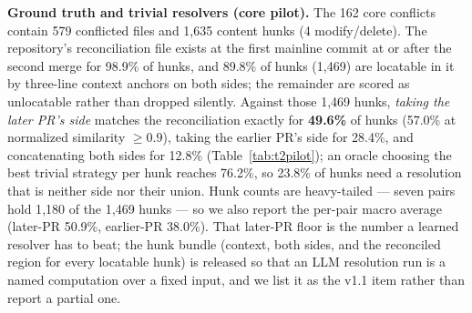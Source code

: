 \documentclass{article}
\begin{document}
\textbf{Ground truth and trivial resolvers (core pilot).} The 162 core conflicts contain 579 conflicted files and 1{,}635 content hunks (4 modify/delete). The repository's reconciliation file exists at the first mainline commit at or after the second merge for 98.9\% of hunks, and 89.8\% of hunks (1{,}469) are locatable in it by three-line context anchors on both sides; the remainder are scored as unlocatable rather than dropped silently. Against those 1{,}469 hunks, \emph{taking the later PR's side} matches the reconciliation exactly for \textbf{49.6\%} of hunks (57.0\% at normalized similarity $\geq 0.9$), taking the earlier PR's side for 28.4\%, and concatenating both sides for 12.8\% (Table~\ref{tab:t2pilot}); an oracle choosing the best trivial strategy per hunk reaches 76.2\%, so 23.8\% of hunks need a resolution that is neither side nor their union. Hunk counts are heavy-tailed --- seven pairs hold 1{,}180 of the 1{,}469 hunks --- so we also report the per-pair macro average (later-PR 50.9\%, earlier-PR 38.0\%). That later-PR floor is the number a learned resolver has to beat; the hunk bundle (context, both sides, and the reconciled region for every locatable hunk) is released so that an LLM resolution run is a named computation over a fixed input, and we list it as the v1.1 item rather than report a partial one. %
\end{document}
